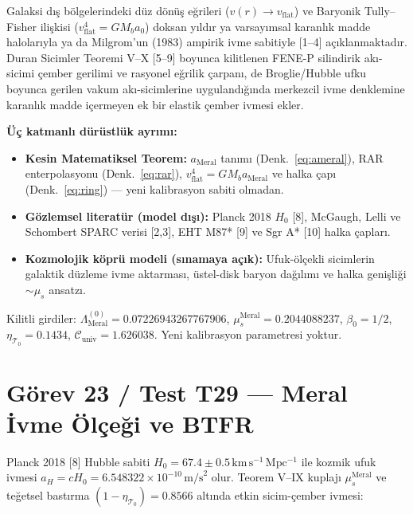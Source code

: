 \documentclass[12pt,a4paper]{article}
\begin{document}
Galaksi dış bölgelerindeki düz dönüş eğrileri ($v(r)\to v_{\mathrm{flat}}$) ve
Baryonik Tully--Fisher ilişkisi ($v_{\mathrm{flat}}^4 = GM_b a_0$) doksan yıldır
ya varsayımsal karanlık madde halolarıyla ya da Milgrom'un (1983) ampirik ivme
sabitiyle [1--4] açıklanmaktadır. Duran Sicimler Teoremi V--X [5--9] boyunca
kilitlenen FENE-P silindirik akı-sicimi çember gerilimi ve rasyonel eğrilik
çarpanı, de Broglie/Hubble ufku boyunca gerilen vakum akı-sicimlerine
uygulandığında merkezcil ivme denklemine karanlık madde içermeyen ek bir elastik
çember ivmesi ekler.

\textbf{Üç katmanlı dürüstlük ayrımı:}
\begin{itemize}
    \item \textbf{Kesin Matematiksel Teorem:} $a_{\mathrm{Meral}}$ tanımı
    (Denk.~\ref{eq:ameral}), RAR enterpolasyonu (Denk.~\ref{eq:rar}),
    $v_{\mathrm{flat}}^4 = GM_b a_{\mathrm{Meral}}$ ve halka çapı
    (Denk.~\ref{eq:ring}) --- yeni kalibrasyon sabiti olmadan.
    \item \textbf{Gözlemsel literatür (model dışı):} Planck 2018 $H_0$ [8],
    McGaugh, Lelli ve Schombert SPARC verisi [2,3],
    EHT M87* [9] ve Sgr A* [10] halka çapları.
    \item \textbf{Kozmolojik köprü modeli (sınamaya açık):} Ufuk-ölçekli
    sicimlerin galaktik düzleme ivme aktarması, üstel-disk baryon dağılımı ve
    halka genişliği $\sim \mu_s$ ansatzı.
\end{itemize}
Kilitli girdiler: $\Lambda_{\mathrm{Meral}}^{(0)} = 0.07226943267767906$,
$\mu_s^{\mathrm{Meral}} = 0.2044088237$, $\beta_0 = 1/2$,
$\eta_{\mathcal{T}_0} = 0.1434$,
$\mathcal{C}_{\mathrm{univ}} = 1.626038$. Yeni kalibrasyon parametresi yoktur.

\section{Görev 23 / Test T29 --- Meral İvme Ölçeği ve BTFR}

Planck 2018 [8] Hubble sabiti $H_0 = 67.4\pm 0.5\,\mathrm{km\,s^{-1}\,Mpc^{-1}}$
ile kozmik ufuk ivmesi $a_H = cH_0 = 6.548322\times 10^{-10}\,\mathrm{m/s}^2$ olur.
Teorem V--IX kuplajı $\mu_s^{\mathrm{Meral}}$ ve teğetsel bastırma
$(1-\eta_{\mathcal{T}_0}) = 0.8566$ altında etkin sicim-çember ivmesi:
\end{document}
